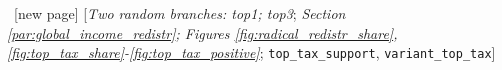 \documentclass[12pt,english]{article}
\begin{document}
\begin{bibunit}
\begin{enumerate}[resume]
  ~[new page] [\textit{Two random branches: top1; top3}; \textit{Section \ref{par:global_income_redistr}; Figures \ref{fig:radical_redistr_share}, \ref{fig:top_tax_share}-\ref{fig:top_tax_positive}}; 
\verb|top_tax_support|, \verb|variant_top_tax|]

\end{enumerate}
\end{bibunit}
\end{document}

